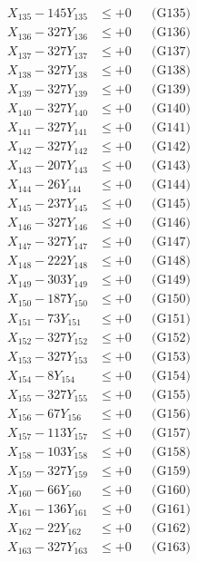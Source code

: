 \documentclass[a4paper,10pt]{article}
\begin{document}
{\begin{align}
X_{135} - 145Y_{135} &\leq +0 && \text{(G135)} \\
X_{136} - 327Y_{136} &\leq +0 && \text{(G136)} \\
X_{137} - 327Y_{137} &\leq +0 && \text{(G137)} \\
X_{138} - 327Y_{138} &\leq +0 && \text{(G138)} \\
X_{139} - 327Y_{139} &\leq +0 && \text{(G139)} \\
X_{140} - 327Y_{140} &\leq +0 && \text{(G140)} \\
\allowbreak
X_{141} - 327Y_{141} &\leq +0 && \text{(G141)} \\
X_{142} - 327Y_{142} &\leq +0 && \text{(G142)} \\
X_{143} - 207Y_{143} &\leq +0 && \text{(G143)} \\
X_{144} - 26Y_{144} &\leq +0 && \text{(G144)} \\
X_{145} - 237Y_{145} &\leq +0 && \text{(G145)} \\
X_{146} - 327Y_{146} &\leq +0 && \text{(G146)} \\
X_{147} - 327Y_{147} &\leq +0 && \text{(G147)} \\
X_{148} - 222Y_{148} &\leq +0 && \text{(G148)} \\
X_{149} - 303Y_{149} &\leq +0 && \text{(G149)} \\
X_{150} - 187Y_{150} &\leq +0 && \text{(G150)} \\
\allowbreak
X_{151} - 73Y_{151} &\leq +0 && \text{(G151)} \\
X_{152} - 327Y_{152} &\leq +0 && \text{(G152)} \\
X_{153} - 327Y_{153} &\leq +0 && \text{(G153)} \\
X_{154} - 8Y_{154} &\leq +0 && \text{(G154)} \\
X_{155} - 327Y_{155} &\leq +0 && \text{(G155)} \\
X_{156} - 67Y_{156} &\leq +0 && \text{(G156)} \\
X_{157} - 113Y_{157} &\leq +0 && \text{(G157)} \\
X_{158} - 103Y_{158} &\leq +0 && \text{(G158)} \\
X_{159} - 327Y_{159} &\leq +0 && \text{(G159)} \\
X_{160} - 66Y_{160} &\leq +0 && \text{(G160)} \\
\allowbreak
X_{161} - 136Y_{161} &\leq +0 && \text{(G161)} \\
X_{162} - 22Y_{162} &\leq +0 && \text{(G162)} \\
X_{163} - 327Y_{163} &\leq +0 && \text{(G163)} \\

\end{align}}
\end{document}
